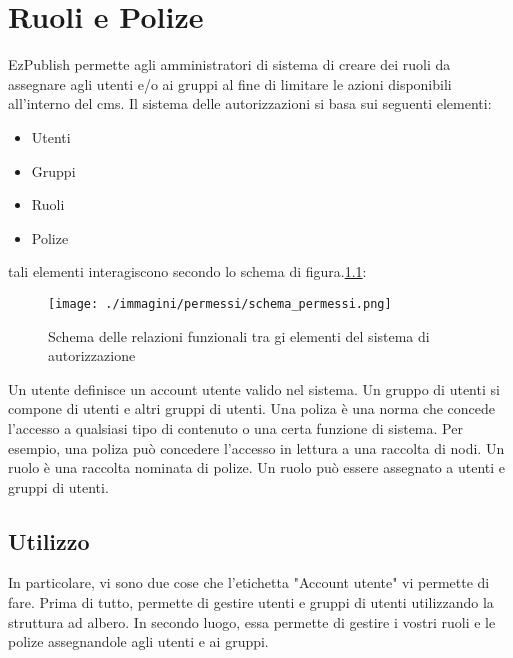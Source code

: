 \chapter{Ruoli e Polize}

EzPublish permette agli amministratori di sistema di creare dei ruoli da assegnare agli utenti e/o ai gruppi al fine di limitare le azioni disponibili all'interno del cms.  Il sistema delle autorizzazioni si basa sui seguenti elementi:
\begin{itemize}
 \item Utenti
\item Gruppi
\item Ruoli
\item Polize
\end{itemize}
 
tali elementi interagiscono secondo lo schema di figura.\ref{fig:perm_schema}:
\begin{figure}[H]
 \centering
 \texttt{[image: ./immagini/permessi/schema\_permessi.png]}
 \caption{Schema delle relazioni funzionali tra gi elementi del sistema di autorizzazione}
 \label{fig:perm_schema}
\end{figure}


Un utente definisce un account utente valido nel sistema. Un gruppo di utenti si compone di utenti e altri
gruppi di utenti. Una poliza è una norma che concede l'accesso a qualsiasi tipo di contenuto o una certa
funzione di sistema. Per esempio, una poliza può concedere l'accesso in lettura a una raccolta di nodi. Un
ruolo è una raccolta nominata di polize. Un ruolo può essere assegnato a utenti e gruppi di utenti.

\section{Utilizzo}

In particolare, vi sono due cose che l'etichetta "Account utente" vi permette di fare. Prima di tutto,
permette di gestire utenti e gruppi di utenti utilizzando la struttura ad albero. In secondo luogo, essa
permette di gestire i vostri ruoli e le polize assegnandole agli utenti e ai gruppi.

% 



